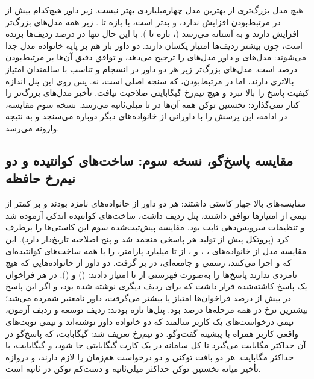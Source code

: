 هیچ مدل بزرگ‌تری از بهترین مدل چهارمیلیاردی بهتر نیست. زیر داور  هیچ‌کدام
بیش از  در مرتبط‌بودن افزایش ندارد، و  بدتر است، با بازه
 تا . زیر  همه مدل‌های بزرگ‌تر افزایش دارند و
 به آستانه می‌رسد (، بازه  تا ). با این
حال تنها در  درصد ردیف‌ها برنده است، چون بیشتر ردیف‌ها امتیاز یکسان دارند. دو
داور باز هم بر پایه خانواده مدل جدا می‌شوند:  مدل‌های  و داور
 مدل‌های  را ترجیح می‌دهد، و توافق دقیق آن‌ها بر مرتبط‌بودن
 درصد است. مدل‌های بزرگ‌تر  زیر هر دو داور در انسجام و تناسب با
سالمندان امتیاز بالاتری دارند، اما در مرتبط‌بودن، که سنجه اصلی است، نه. پس روی این
پنل اندازه کیفیت پاسخ را بالا نبرد و هیچ نیم‌رخ  گیگابایتی صلاحیت نیافت.
تأخیر مدل‌های بزرگ‌تر را کنار نمی‌گذارد: نخستین توکن همه آن‌ها در  تا 
میلی‌ثانیه می‌رسد. نسخه سوم مقایسه، در ادامه، این پرسش را با داورانی از خانواده‌های
دیگر دوباره می‌سنجد و به نتیجه وارونه می‌رسد.

\subsection{مقایسه پاسخ‌گو، نسخه سوم: ساخت‌های کوانتیده و دو نیم‌رخ حافظه}
\label{sec:res-resp-v3}

مقایسه‌های بالا چهار کاستی داشتند: هر دو داور از خانواده‌های نامزد بودند و بر کمتر از
نیمی از امتیازها توافق داشتند، پنل  ردیف داشت، ساخت‌های کوانتیده اندکی آزموده
شد و تنظیمات سرویس‌دهی ثابت بود. مقایسه پیش‌ثبت‌شده سوم این کاستی‌ها را برطرف کرد
(پروتکل پیش از تولید هر پاسخی منجمد شد و پنج اصلاحیه تاریخ‌دار دارد). این مقایسه
 مدل از خانواده‌های ، ،  و ، از
 تا  میلیارد پارامتر، را با همه ساخت‌های کوانتیده‌ای که  و
 اجرا می‌کنند، رسمی و جامعه‌ای، در بر گرفت. دو داور از خانواده‌هایی که
هیچ نامزدی ندارند پاسخ‌ها را به‌صورت فهرستی از  تا  امتیاز دادند:
 () و  (). در هر فراخوان یک پاسخ
کاشته‌شده قرار داشت که برای ردیف دیگری نوشته شده بود، و اگر این پاسخ در بیش از 
درصد فراخوان‌ها امتیاز  یا بیشتر می‌گرفت، داور نامعتبر شمرده می‌شد؛ بیشترین نرخ در
همه مرحله‌ها  درصد بود. پنل‌ها تازه بودند:  ردیف توسعه و  ردیف
آزمون، نیمی درخواست‌های یک کاربر سالمند که دو خانواده داور نوشته‌اند و نیمی نوبت‌های
واقعی کاربر همراه با پیشینه گفت‌وگو. دو نیم‌رخ تعریف شد:  گیگابایت، که پاسخ‌گو
در آن حداکثر  مگابایت می‌گیرد تا کل سامانه در یک کارت  گیگابایتی جا
شود، و  گیگابایت، با حداکثر  مگابایت. هر دو بافت  توکنی و دو
درخواست هم‌زمان را لازم دارند، و دروازه تأخیر میانه نخستین توکن حداکثر 
میلی‌ثانیه و دست‌کم  توکن در ثانیه است.


